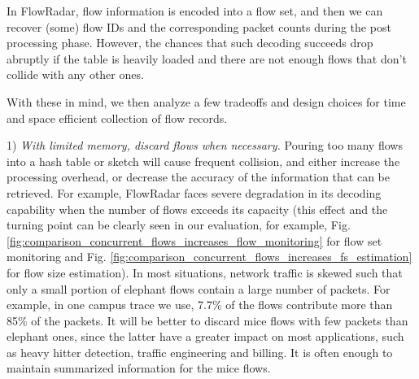 In FlowRadar\cite{li_flowradar:_2016}, flow information is encoded into a flow set, and then we can recover (some) flow IDs and the corresponding packet counts during the post processing phase. However, the chances that such decoding succeeds drop abruptly if the table is heavily loaded and there are not enough flows that don't collide with any other ones.



With these in mind, we then analyze a few tradeoffs and design choices 
for time and space efficient collection of flow records.

1) {\em With limited memory, discard flows when necessary.} Pouring too many flows into a 
hash table or sketch will cause frequent collision, and either increase the processing overhead, 
or decrease the accuracy of the information that can be retrieved. 
For example, FlowRadar faces severe degradation in its decoding capability
 when the number of flows exceeds its capacity 
(this effect and the turning point can be clearly seen in our evaluation, 
for example, Fig. \ref{fig:comparison_concurrent_flows_increases_flow_monitoring} for flow set monitoring 
and Fig. \ref{fig:comparison_concurrent_flows_increases_fs_estimation} for flow size estimation).  
In most situations, network traffic is skewed such that 
only a small portion of elephant flows contain a large number of packets. 
For example, in one campus trace we use, 7.7\% of the flows contribute more than 85\% of the packets. 
It will be better to discard mice flows with few packets than elephant ones, 
since the latter have a greater impact on most applications, 
such as heavy hitter detection, traffic engineering and billing. It is often enough to maintain summarized information for the mice flows.

